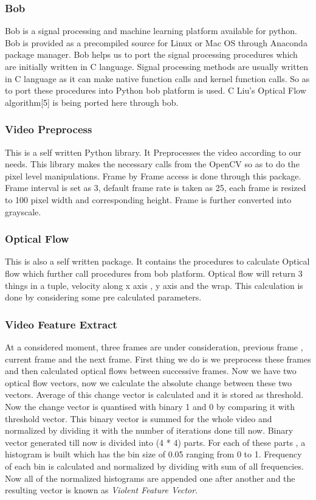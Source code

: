 \subsubsection{Bob}
Bob is a signal processing and machine learning platform available for python. Bob is provided as a precompiled source for Linux or Mac OS through Anaconda package manager. Bob helps us to port the signal processing procedures which are initially written in C language. Signal processing methods are usually written in C language as it can make native function calls and kernel function calls. So as to port these procedures into Python bob platform is used. C Liu's Optical Flow algorithm[5] is being ported here through bob.
\subsubsection{Video Preprocess}
This is a self written Python library. It Preprocesses the video according to our needs. This library makes the necessary calls from the OpenCV so as to do the pixel level manipulations. Frame by Frame access is done through this package. Frame interval is set as 3, default frame rate is taken as 25, each frame is resized to 100 pixel width and corresponding height. Frame is further converted into grayscale.
\subsubsection{Optical Flow}
This is also a self written package. It contains the procedures to calculate Optical flow which further call procedures from bob platform. Optical flow will return 3 things in a tuple, velocity along x axis , y axis and the wrap. This calculation is done by considering some pre calculated parameters.
\subsubsection{Video Feature Extract}
At a considered moment, three frames are under consideration, previous frame , current frame and the next frame. First thing we do is we preprocess these frames and then calculated optical flows between successive frames. Now we have two optical flow vectors, now we calculate the absolute change between these two vectors. Average of this change vector is calculated and it is stored as threshold. Now the change vector is quantised with binary 1 and 0 by comparing it with threshold vector. This binary vector is summed for the whole video and normalized by dividing it with the number of iterations done till now. Binary vector generated till now is divided into (4 * 4) parts. For each of these parts , a histogram is built which has the bin size of 0.05 ranging from 0 to 1. Frequency of each bin is calculated and normalized by dividing with sum of all frequencies. Now all of the normalized histograms are appended one after another and the resulting vector is known as \textit{Violent Feature Vector}.



